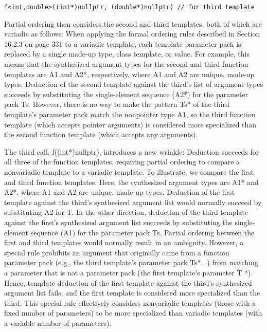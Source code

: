 \begin{lstlisting}[style=styleCXX]
f<int,double>((int*)nullptr, (double*)nullptr) // for third template
\end{lstlisting}

Partial ordering then considers the second and third templates, both of which are variadic as follows: When applying the formal ordering rules described in Section 16.2.3 on page 331 to a variadic template, each template parameter pack is replaced by a single made-up type, class template, or value. For example, this means that the synthesized argument types for the second and third function templates are A1 and A2*, respectively, where A1 and A2 are unique, made-up types. Deduction of the second template against the third’s list of argument types succeeds by substituting the single-element sequence (A2*) for the parameter pack Ts. However, there is no way to make the pattern Ts* of the third template’s parameter pack match the nonpointer type A1, so the third function template (which accepts pointer arguments) is considered more specialized than the second function template (which accepts any arguments).

The third call, f((int*)nullptr), introduces a new wrinkle: Deduction succeeds for all three of the function templates, requiring partial ordering to compare a nonvariadic template to a variadic template. To illustrate, we compare the first and third function templates. Here, the synthesized argument types are A1* and A2*, where A1 and A2 are unique, made-up types. Deduction of the first template against the third’s synthesized argument list would normally succeed by substituting A2 for T. In the other direction, deduction of the third template against the first’s synthesized argument list succeeds by substituting the single-element sequence (A1) for the parameter pack Ts. Partial ordering between the first and third templates would normally result in an ambiguity. However, a special rule prohibits an argument that originally came from a function parameter pack (e.g., the third template’s parameter pack Ts*...) from matching a parameter that is not a parameter pack (the first template’s parameter T *). Hence, template deduction of the first template against the third’s synthesized argument list fails, and the first template is considered more specialized than the third. This special rule effectively considers nonvariadic templates (those with a fixed number of parameters) to be more specialized than variadic templates (with a variable number of parameters).

